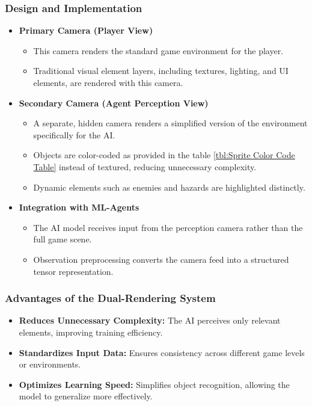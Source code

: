 \documentclass[12pt,oneside,openright,a4paper]{cpe-english-project}
\begin{document}
\subsubsection{Design and Implementation}
\begin{itemize}
\item  \textbf{Primary Camera (Player View)}
\begin{itemize}
\item  This camera renders the standard game environment for the player.
\item  Traditional visual element layers, including textures, lighting, and UI elements, are rendered with this camera.
\end{itemize}
\item  \textbf{Secondary Camera (Agent Perception View)}
\begin{itemize}
\item  A separate, hidden camera renders a simplified version of the environment specifically for the AI.
\item  Objects are color-coded as provided in the table \ref{tbl:Sprite Color Code Table} instead of textured, reducing unnecessary complexity.
\item  Dynamic elements such as enemies and hazards are highlighted distinctly.
\end{itemize}
\item  \textbf{Integration with ML-Agents}
\begin{itemize}
\item  The AI model receives input from the perception camera rather than the full game scene.
\item  Observation preprocessing converts the camera feed into a structured tensor representation.
\end{itemize}
\end{itemize}
\subsubsection{Advantages of the Dual-Rendering System}
\begin{itemize}
\item  \textbf{Reduces Unnecessary Complexity:} The AI perceives only relevant elements, improving training efficiency.
\item  \textbf{Standardizes Input Data:} Ensures consistency across different game levels or environments.
\item  \textbf{Optimizes Learning Speed:} Simplifies object recognition, allowing the model to generalize more effectively.
\end{itemize}
\end{document}
